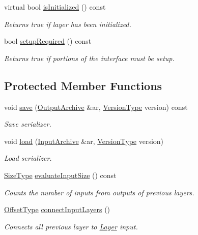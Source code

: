 \begin{DoxyCompactItemize}
virtual bool \hyperlink{classffnn_1_1layer_1_1_layer_a2166b32e32c3f4e979ed7454ddb5817f}{is\-Initialized} () const 
\begin{DoxyCompactList}\small\item\em Returns true if layer has been initialized. \end{DoxyCompactList}\item 
bool \hyperlink{classffnn_1_1layer_1_1_layer_a2ed6596711548678da8ef9ed9e59b06c}{setup\-Required} () const 
\begin{DoxyCompactList}\small\item\em Returns true if portions of the interface must be setup. \end{DoxyCompactList}\end{DoxyCompactItemize}
\subsection*{Protected Member Functions}
\begin{DoxyCompactItemize}
\item 
void \hyperlink{classffnn_1_1layer_1_1_layer_ac265fc929a178b111337226dd1cb62b6}{save} (\hyperlink{classffnn_1_1internal_1_1_serializable_acf5baead716eb277337a4437e88a5743}{Output\-Archive} \&ar, \hyperlink{classffnn_1_1internal_1_1_serializable_a32fe7d82b0caf9fe8b6fb7c312a26028}{Version\-Type} version) const 
\begin{DoxyCompactList}\small\item\em Save serializer. \end{DoxyCompactList}\item 
void \hyperlink{classffnn_1_1layer_1_1_layer_a23f5f3c958d888632010327471c7b012}{load} (\hyperlink{classffnn_1_1internal_1_1_serializable_aadc27d79d606f35a82dd88bad33fa6d2}{Input\-Archive} \&ar, \hyperlink{classffnn_1_1internal_1_1_serializable_a32fe7d82b0caf9fe8b6fb7c312a26028}{Version\-Type} version)
\begin{DoxyCompactList}\small\item\em Load serializer. \end{DoxyCompactList}\item 
\hyperlink{classffnn_1_1layer_1_1_layer_a4c4c9782d2aed41c2a5000ec5da5601a}{Size\-Type} \hyperlink{classffnn_1_1layer_1_1_layer_afc4ec2b6a43788f58dcd18a26a9e30de}{evaluate\-Input\-Size} () const 
\begin{DoxyCompactList}\small\item\em Counts the number of inputs from outputs of previous layers. \end{DoxyCompactList}\item 
\hyperlink{classffnn_1_1layer_1_1_layer_a2130560f43788898079b7c5c01fb94c8}{Offset\-Type} \hyperlink{classffnn_1_1layer_1_1_layer_a9d692bce889ddc693e5bac8dda5d4cd2}{connect\-Input\-Layers} ()
\begin{DoxyCompactList}\small\item\em Connects all previous layer to \hyperlink{classffnn_1_1layer_1_1_layer}{Layer} input. \end{DoxyCompactList}\end{DoxyCompactItemize}
